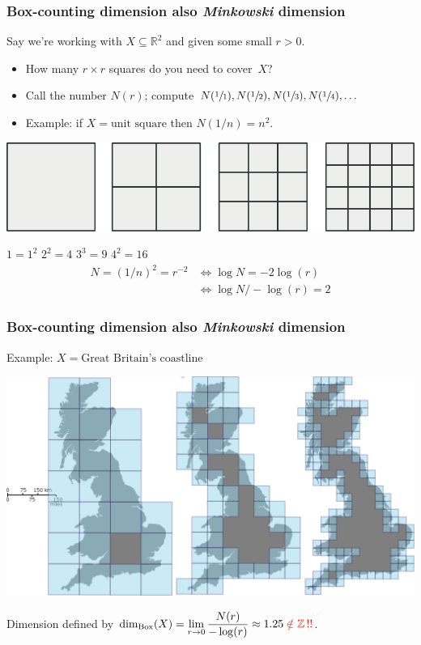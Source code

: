 \documentclass[12pt]{beamer}
\newcommand\dimB{\operatorname{dim}_{\operatorname{Box}}}
\begin{document}
\begin{frame}
\frametitle{Box-counting dimension \footnotesize\hfill also \emph{Minkowski} dimension}

Say we're working with $X \subseteq \mathbb{R}^2$ and given some small $r > 0$.

\begin{itemize}
	\item How many $r \times r$ squares do you need to cover~$X$? \pause
	\item Call the number $N(r)$; compute $N(\sfrac 1 1), N(\sfrac 1 2), N(\sfrac 1 3), N(\sfrac 1 4), \dotsc$ 	\pause
	\item \alert{Example:} if $X = \text{unit square}$ then $N(1/n) = n^2$. 
\end{itemize}
\begin{center}
	\includegraphics[width=\linewidth]{../media/processed/box_counting}
\end{center}	
	\hfill $1 = 1^2$
	\hfill\hfill $2^2 = 4$
	\hfill\hfill $3^3 = 9$
	\hfill\hfill $4^2 = 16$
	\hfill{}
\pause
\begin{align*}
	N = (1/n)^2 = r^{-2} &\iff \log N = -2 \log(r) \\&\iff \log N / -\log(r) = 2
\end{align*}
\end{frame}

\begin{frame}
\frametitle{Box-counting dimension \footnotesize\hfill also \emph{Minkowski} dimension}
\alert{Example:}	 $X = \text{Great Britain's coastline}$
\begin{center}
	\includegraphics[width=0.9\linewidth]{../media/box_dimension}
\end{center}
\pause
Dimension defined by $\displaystyle \dimB(X) = \lim_{r \to 0} \frac{N(r)}{-\log(r)} \approx 1.25 \color{red}\notin \mathbb{Z}\,!!$.
\end{frame}
\end{document}
